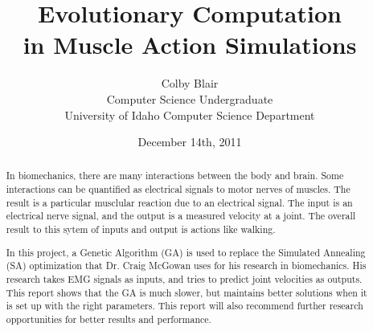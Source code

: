 \documentclass[11pt,letterpaper]{article}
\date{December 14th, 2011}
\title{Evolutionary Computation\\
in Muscle Action Simulations
}
\author{Colby Blair \\
	Computer Science Undergraduate \\
	University of Idaho Computer Science Department
}
\begin{document}
\maketitle

\begin{abstract}
In biomechanics, there are many interactions between the body and brain. Some
interactions can be quantified as electrical signals to motor nerves of muscles.
The result is a particular musclular reaction due to an electrical signal. The
input is an electrical nerve signal, and the output is a measured velocity at
a joint. The overall result to this sytem of inputs and output is actions like 
walking.

In this project, a Genetic Algorithm (GA) is used to replace the Simulated Annealing (SA) optimization
that Dr. Craig McGowan uses for his research in biomechanics. His research takes EMG signals as inputs,
and tries to predict joint velocities as outputs. This report shows that the GA is much slower, but 
maintains better solutions when it is set up with the right parameters. This report will also recommend
further research opportunities for better results and performance.
\end{abstract}

\thispagestyle{empty}


\pagebreak

\thispagestyle{empty}
\tableofcontents
\listoffigures

\pagebreak

\setcounter{page}{1}





%
\end{document}
